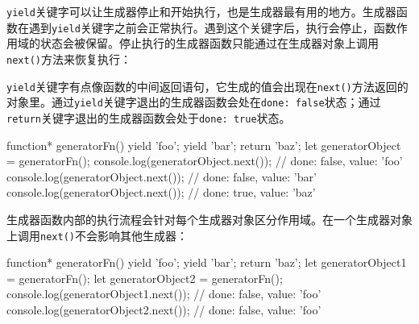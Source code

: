 \texttt{yield}关键字可以让生成器停止和开始执行，也是生成器最有用的地方。生成器函数在遇到\texttt{yield}关键字之前会正常执行。遇到这个关键字后，执行会停止，函数作用域的状态会被保留。停止执行的生成器函数只能通过在生成器对象上调用\texttt{next()}方法来恢复执行：

\texttt{yield}关键字有点像函数的中间返回语句，它生成的值会出现在\texttt{next()}方法返回的对象里。通过\texttt{yield}关键字退出的生成器函数会处在\texttt{done: false}状态；通过\texttt{return}关键字退出的生成器函数会处于\texttt{done: true}状态。

\begin{JavaScript}
function* generatorFn() {  
    yield 'foo'; yield 'bar';   
    return 'baz'; 
} 
let generatorObject = generatorFn(); 
console.log(generatorObject.next());  // { done: false, value: 'foo' } 
console.log(generatorObject.next());  // { done: false, value: 'bar' } 
console.log(generatorObject.next());  // { done: true, value: 'baz' } 
\end{JavaScript}

生成器函数内部的执行流程会针对每个生成器对象区分作用域。在一个生成器对象上调用\texttt{next()}不会影响其他生成器：

\begin{JavaScript}
function* generatorFn() {   
    yield 'foo';    
    yield 'bar';   
    return 'baz'; 
} 
let generatorObject1 = generatorFn(); 
let generatorObject2 = generatorFn(); 
console.log(generatorObject1.next()); // { done: false, value: 'foo' } 
console.log(generatorObject2.next()); // { done: false, value: 'foo' } 
\end{JavaScript}











\newpage